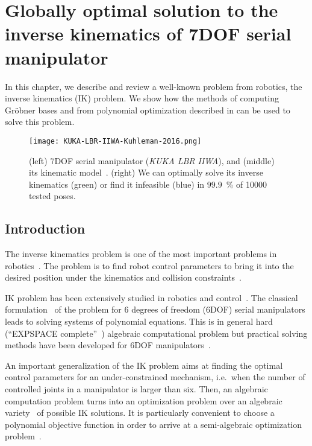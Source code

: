 \chapter{Globally optimal solution to the inverse kinematics of 7DOF serial manipulator}
In this chapter, we describe and review a well-known problem from robotics, the inverse kinematics (IK) problem.
We show how the methods of computing Gr\"obner bases and from polynomial optimization described in  can be used to solve this problem.

\begin{figure}[h]
\texttt{[image: KUKA-LBR-IIWA-Kuhleman-2016.png]} \resizebox{0.48\textwidth}{!}{}
  \caption{(left) 7DOF serial manipulator (\textit{KUKA LBR IIWA}), and (middle) its kinematic model~\cite{Kuhlemann2016}. (right) We can optimally solve its inverse kinematics (green) or find it infeasible (blue) in $99.9$~\% of \num{10000} tested poses.}
\end{figure}

\section{Introduction}
The inverse kinematics problem is one of the most important problems in robotics~\cite{shigley1980theory}.
The problem is to find robot control parameters to bring it into the desired position under the kinematics and collision constraints~\cite{Jazar2007}.

IK problem has been extensively studied in robotics and control~\cite{Raghavan1993InverseKO,Raghavan1995SolvingPS}. The classical formulation~\cite{Raghavan1993InverseKO} of the problem for 6 degrees of freedom (6DOF) serial manipulators leads to solving systems of polynomial equations. This is in general hard (``EXPSPACE complete''~\cite{MAYR1982305}) algebraic computational problem but practical solving methods have been developed for 6DOF manipulators~\cite{Raghavan1993InverseKO,Manocha-Canny1994,Diankov2010}.

An important generalization of the IK problem aims at finding the optimal control parameters for an under-constrained mechanism, i.e.\ when the number of controlled joints in a manipulator is larger than six. Then, an algebraic computation problem turns into an optimization problem over an algebraic variety~\cite{Cox-Little-Shea2015} of possible IK solutions. It is particularly convenient to choose a polynomial objective function in order to arrive at a semi-algebraic optimization problem~\cite{Lasserre}.

